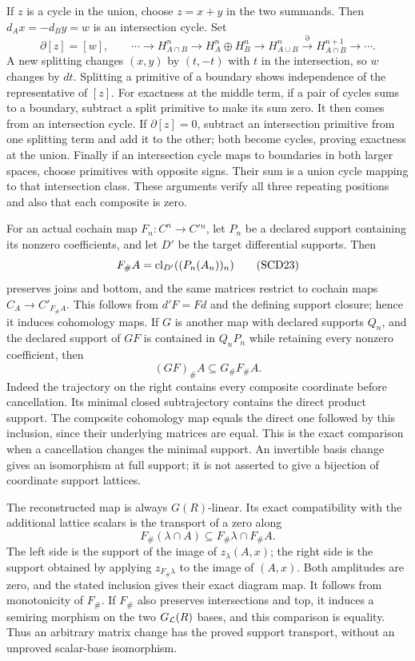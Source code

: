 If \(z\) is a cycle in the union, choose \(z=x+y\) in the two
summands. Then \(d_Ax=-d_By=w\) is an intersection cycle. Set
\[
 \partial[z]=[w],\qquad
 \cdots\to H_{A\cap B}^n\to H_A^n\oplus H_B^n
 \to H_{A\cup B}^n\xrightarrow{\partial}H_{A\cap B}^{n+1}\to\cdots .
 \tag{SCD22}
\]
A new splitting changes \((x,y)\) by \((t,-t)\) with \(t\) in
the intersection, so \(w\) changes by \(dt\). Splitting a primitive
of a boundary shows independence of the representative of \([z]\).
For exactness at the middle term, if a pair of cycles sums to a
boundary, subtract a split primitive to make its sum zero. It then
comes from an intersection cycle. If \(\partial[z]=0\), subtract
an intersection primitive from one splitting term and add it to
the other; both become cycles, proving exactness at the union.
Finally if an intersection cycle maps to boundaries in both larger
spaces, choose primitives with opposite signs. Their sum is a union
cycle mapping to that intersection class. These arguments verify
all three repeating positions and also that each composite is zero.

For an actual cochain map \(F_n:C^n\to C'{}^n\), let \(P_n\)
be a declared support containing its nonzero coefficients, and
let \(D'\) be the target differential supports. Then
\[
 F_\#A=\operatorname{cl}_{D'}((P_n(A_n))_n)
 \tag{SCD23}
\]
preserves joins and bottom, and the same matrices restrict to
cochain maps \(C_A\to C'_{F_\#A}\). This follows from \(d'F=Fd\)
and the defining support closure; hence it induces cohomology maps.
If \(G\) is another map with declared supports \(Q_n\), and the
declared support of \(GF\) is contained in \(Q_nP_n\) while retaining
every nonzero coefficient, then
\[
 (GF)_\#A\subseteq G_\#F_\#A .
 \tag{SCD24}
\]
Indeed the trajectory on the right contains every composite
coordinate before cancellation. Its minimal closed subtrajectory
contains the direct product support. The composite cohomology map
equals the direct one followed by this inclusion, since their
underlying matrices are equal. This is the exact comparison when
a cancellation changes the minimal support. An invertible basis
change gives an isomorphism at full support; it is not asserted
to give a bijection of coordinate support lattices.

The reconstructed map is always \(G(R)\)-linear. Its exact
compatibility with the additional lattice scalars is the transport
of a zero along
\[
 F_\#(\lambda\cap A)\subseteq F_\#\lambda\cap F_\#A.
\]
The left side is the support of the image of \(z_\lambda(A,x)\);
the right side is the support obtained by applying
\(z_{F_\#\lambda}\) to the image of \((A,x)\). Both amplitudes
are zero, and the stated inclusion gives their exact diagram map.
It follows from monotonicity of \(F_\#\). If \(F_\#\) also
preserves intersections and top, it induces a semiring morphism
on the two \(G_{\mathcal L}(R)\) bases, and this comparison is equality.
Thus an arbitrary matrix change has the proved support transport,
without an unproved scalar-base isomorphism.

